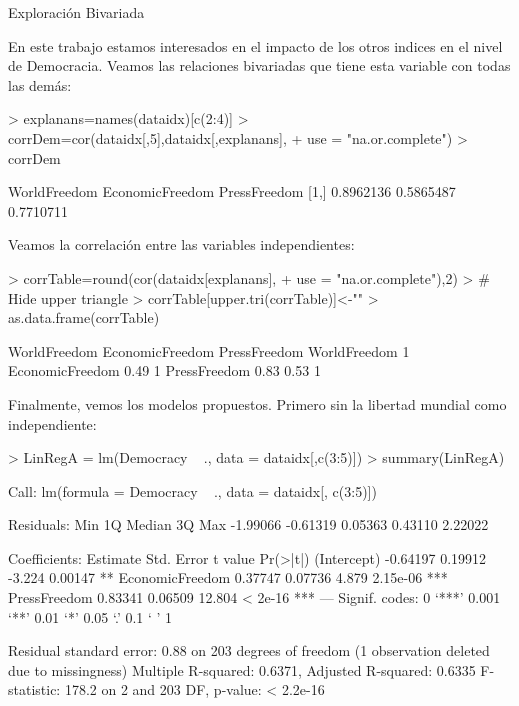 \documentclass{article}
\begin{document}
Exploración Bivariada

En este trabajo estamos interesados en el impacto de los otros indices en el nivel de Democracia. Veamos las relaciones bivariadas que tiene esta variable con todas las demás:
\begin{Schunk}
\begin{Sinput}
> explanans=names(dataidx)[c(2:4)]
> corrDem=cor(dataidx[,5],dataidx[,explanans],
+     use = "na.or.complete")
> corrDem
\end{Sinput}
\begin{Soutput}
     WorldFreedom EconomicFreedom PressFreedom
[1,]    0.8962136       0.5865487    0.7710711
\end{Soutput}
\end{Schunk}




Veamos la correlación entre las variables independientes:

\begin{Schunk}
\begin{Sinput}
> corrTable=round(cor(dataidx[explanans],
+                use = "na.or.complete"),2)
> # Hide upper triangle
> corrTable[upper.tri(corrTable)]<-""
> as.data.frame(corrTable)
\end{Sinput}
\begin{Soutput}
                WorldFreedom EconomicFreedom PressFreedom
WorldFreedom               1                             
EconomicFreedom         0.49               1             
PressFreedom            0.83            0.53            1
\end{Soutput}
\end{Schunk}


Finalmente, vemos los modelos propuestos. Primero sin la libertad mundial como independiente:
\begin{Schunk}
\begin{Sinput}
> LinRegA = lm(Democracy ~ ., data = dataidx[,c(3:5)])
> summary(LinRegA)
\end{Sinput}
\begin{Soutput}
Call:
lm(formula = Democracy ~ ., data = dataidx[, c(3:5)])

Residuals:
     Min       1Q   Median       3Q      Max 
-1.99066 -0.61319  0.05363  0.43110  2.22022 

Coefficients:
                Estimate Std. Error t value Pr(>|t|)    
(Intercept)     -0.64197    0.19912  -3.224  0.00147 ** 
EconomicFreedom  0.37747    0.07736   4.879 2.15e-06 ***
PressFreedom     0.83341    0.06509  12.804  < 2e-16 ***
---
Signif. codes:  0 ‘***’ 0.001 ‘**’ 0.01 ‘*’ 0.05 ‘.’ 0.1 ‘ ’ 1

Residual standard error: 0.88 on 203 degrees of freedom
  (1 observation deleted due to missingness)
Multiple R-squared:  0.6371,	Adjusted R-squared:  0.6335 
F-statistic: 178.2 on 2 and 203 DF,  p-value: < 2.2e-16
\end{Soutput}
\end{Schunk}
\end{document}
